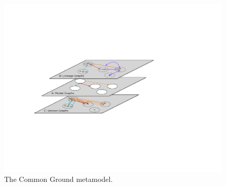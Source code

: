 \documentclass{sig-alternate}
\begin{document}

\smallitembot



\begin{figure}[t]
\centering
\includegraphics[width=\linewidth]{layers.pdf}
\caption{The Common Ground metamodel.} 
\label{fig:layers}
\end{figure}
\end{document}
